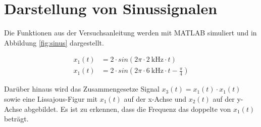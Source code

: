 \documentclass[
    paper=a4,
    fontsize=10pt,
    DIV=calc,
    twocolumn,
    oneside,
]{scrartcl}
\date{\today}
\begin{document}
\maketitle




\section{Darstellung von Sinussignalen}
    Die Funktionen aus der Versuchsanleitung \cite{versuch1} werden mit MATLAB simuliert und in Abbildung \ref{fig:sinus} dargestellt.

    \begin{align}
        x_1(t) &= 2 \cdot sin(2\pi \cdot \SI{2}{\kilo\hertz} \cdot t)\\
        x_1(t) &= 2 \cdot sin(2\pi \cdot \SI{6}{\kilo\hertz} \cdot t - \frac{\pi}{4})
    \end{align}

    Darüber hinaus wird das Zusammengesetze Signal \(x_3(t)=x_1(t) \cdot x_1(t)\) sowie eine Lissajous-Figur mit \(x_1(t)\) auf der x-Achse und \(x_2(t)\) auf der y-Achse abgebildet. Es ist zu erkennen, dass die Frequenz das doppelte von \(x_1(t)\) beträgt.
\end{document}
